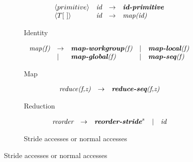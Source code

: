 \begin{figure}[t]
\centering

 \begin{subfigure}[b]{1\linewidth}
 \begin{mdframed}
 $$
 \begin{array}{llll}
  \langle primitive \rangle & \textit{id} & \rightarrow & \textit{\textbf{id-primitive}}\\
  \langle T[\ ] \rangle     & \textit{id} & \rightarrow & \textit{map(id)}\\  
 \end{array}
 $$
 \end{mdframed}
   \caption{Identity}
   \label{fig:low:id}
 \end{subfigure}

\begin{subfigure}[b]{1\linewidth}
\begin{mdframed}
\vspace{-.5em}
$$
\begin{array}{lllll}
\textit{map(f)} & \rightarrow & \textit{\textbf{map-workgroup}(f)} & | & \textit{\textbf{map-local}(f)}\\
 & | & \textit{\textbf{map-global}(f)} & | & \textit{\textbf{map-seq}(f)}\\          
\end{array}
$$
\end{mdframed}
  \caption{Map}
  \label{fig:low:map}
\end{subfigure}

\vspace{\ruleSpace}
\begin{subfigure}[b]{1\linewidth}
\begin{mdframed}
$$
\begin{array}{lll}
  \pat{reduce(f,z)} & \rightarrow & \pat{\textbf{reduce-seq}(f,z)}%
\end{array}
$$
\end{mdframed}
  \caption{Reduction}
  \label{fig:low:red}
\end{subfigure}

\vspace{\ruleSpace}
\begin{subfigure}[b]{1\linewidth}
\begin{mdframed}
$$
\begin{array}{lllll}
  \textit{reorder}  & \rightarrow & \textit{\textbf{reorder-stride}}^s & | & \textit{id}
\end{array}
$$
\end{mdframed}
  \caption{Stride accesses or normal accesses}
  \label{fig:low:stride}
\end{subfigure}


\end{figure}
